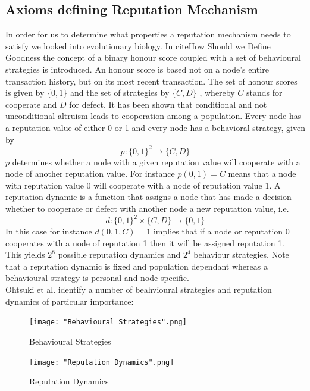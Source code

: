 \documentclass[11pt,a4paper]{article}
\theoremstyle{definition}
\theoremstyle{theorem}
\theoremstyle{proposition}
\theoremstyle{corollary}
\theoremstyle{lemma}
\theoremstyle{example}
\theoremstyle{remark}
\begin{document}
\subsection{Axioms defining Reputation Mechanism}
\label{subsec:Axioms defining Reputation Mechanism}
In order for us to determine what properties a reputation mechanism needs to satisfy we looked into evolutionary biology. In cite{How Should we Define Goodness} the concept of a binary honour score coupled with a set of behavioural strategies is introduced. An honour score is based not on a node's entire transaction history, but on its most recent transaction. The set of honour scores is given by $\{0,1\}$ and the set of strategies by $\{C,D\}$ , whereby $C$ stands for cooperate and $D$ for defect. It has been shown that conditional and not unconditional altruism leads to cooperation among a population. Every node has a reputation value of either 0 or 1 and every node has a behavioral strategy, given by 
\[
p:\{0,1\}^2\rightarrow{}\{C,D\}
\]
$p$ determines whether a node with a given reputation value will cooperate with a node of another reputation value. For instance $p(0,1)=C$ means that a node with reputation value 0 will cooperate with a node of reputation value 1. A reputation dynamic is a function that assigns a node that has made a decision whether to cooperate or defect with another node a new reputation value, i.e.
\[
d:\{0,1\}^2\times{}\{C,D\}\rightarrow{}\{0,1\}
\]
In this case for instance $d(0,1,C)=1$ implies that if a node or reputation 0 cooperates with a node of reputation 1 then it will be assigned reputation 1. \vspace{1em}\\
This yields $2^8$ possible reputation dynamics and $2^4$ behaviour strategies. Note that a reputation dynamic is fixed and population dependant whereas a behavioural strategy is personal and node-specific. \vspace{1em}\\

\noindent{}Ohtsuki et al. identify a number of beahvioural strategies and reputation dynamics of particular importance:

{\centering
\begin{figure}[H]
\begin{center}
\texttt{[image: "Behavioural Strategies".png]}
\end{center}
\label{fig:BehvaiouralStrategies}
\caption{Behavioural Strategies}
\end{figure}
}

{\centering
\begin{figure}[H]
\texttt{[image: "Reputation Dynamics".png]}
\label{fig:ReputationDynamics}
\caption{Reputation Dynamics}
\end{figure}
}
\end{document}
